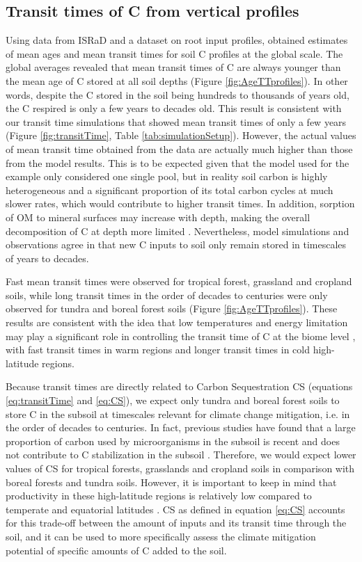 \documentclass[11pt, oneside, a4paper]{article}   	%
\begin{document}
\subsection{Transit times of C from vertical profiles}
Using data from ISRaD and a dataset on root input profiles, \citet{Xiao2022} obtained estimates of mean ages and mean transit times for soil C profiles at the global scale. The global averages revealed that mean transit times of C are always younger than the mean age of C stored at all soil depths (Figure \ref{fig:AgeTTprofiles}). In other words, despite the C stored in the soil being hundreds to thousands of years old, the C respired is only a few years to decades old. This result is consistent with our transit time simulations that showed mean transit times of only a few years (Figure \ref{fig:transitTime}, Table \ref{tab:simulationSetup}). However, the actual values of mean transit time obtained from the data are actually much higher than those from the model results. This is to be expected given that the model used for the example only considered one single pool, but in reality soil carbon is highly heterogeneous and a significant proportion of its total carbon cycles at much slower rates, which would contribute to higher transit times.  In addition, sorption of OM to mineral surfaces may increase with depth, making the overall decomposition of C at depth more limited \citep{Ahrens2020}. Nevertheless, model simulations and observations agree in that new C inputs to soil only remain stored in timescales of years to decades. 

Fast mean transit times were observed for tropical forest, grassland and cropland soils, while long transit times in the order of decades to centuries were only observed for tundra and boreal forest soils (Figure \ref{fig:AgeTTprofiles}). These results are consistent with the idea that low temperatures and energy limitation may play a significant role in controlling the transit time of C at the biome level \citep{Lu2018, Xiao2022}, with fast transit times in warm regions and longer transit times in cold high-latitude regions.

Because transit times are directly related to Carbon Sequestration CS (equations \ref{eq:transitTime} and \ref{eq:CS}), we expect only tundra and boreal forest soils to store C in the subsoil at timescales relevant for climate change mitigation, i.e. in the order of decades to centuries. In fact, previous studies have found that a large proportion of carbon used by microorganisms in the subsoil is recent and does not contribute to C stabilization in the subsoil \citep{Balesdent2018, Scheibe2023}. Therefore, we would expect lower values of CS for tropical forests, grasslands and cropland soils in comparison with boreal forests and tundra soils. 
However, it is important to keep in mind that productivity in these high-latitude regions is relatively low compared to temperate and equatorial latitudes \citep{Xiao2023}. CS as defined in equation \ref{eq:CS} accounts for this trade-off between the amount of inputs and its transit time through the soil, and it can be used to more specifically assess the climate mitigation potential of specific amounts of C added to the soil.
\end{document}
